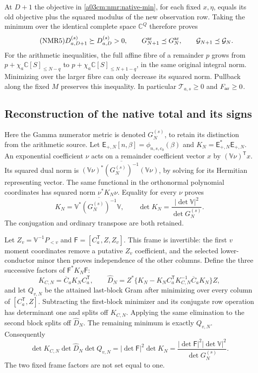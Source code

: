\documentclass[11pt,a4paper]{article}
\begin{document}
At $D+1$ the objective in \eqref{a03cm:nmr:native-min}, for each fixed
$x,\eta$, equals its old objective plus the squared modulus of the
new observation row. Taking the minimum over the identical complete
space $\mathbb C^Q$ therefore proves
\begin{equation}\tag{NMR5}\label{a03cm:nmr:monotonicity}
D_{a,D+1}^{(s)}\succeq D_{a,D}^{(s)}>0,\qquad
G_{N+1}^{\rm ar}\preceq G_N^{\rm ar},\qquad
\mathcal G_{N+1}\preceq\mathcal G_N .
\end{equation}
For the arithmetic inequalities, the full affine fibre of a remainder
$p$ grows from $p+\chi_a\mathbb C[S]_{\leq N-q}$ to
$p+\chi_a\mathbb C[S]_{\leq N+1-q}$, in the same original integral
norm. Minimizing over the larger fibre can only decrease its squared
norm. Pullback along the fixed $M$ preserves this inequality.
In particular $\mathcal T_{a,s}\geq0$ and $F_{\rm ar}\geq0$.

\subsection{Reconstruction of the native total and its signs}
Here the Gamma numerator metric is denoted $G_N^{(s)}$, to retain
its distinction from the arithmetic source. Let
$\mathsf E_{+,N}[n,\beta]=\phi_{n,s,c_0}(\beta)$ and
$K_N=\mathsf E_{+,N}^*\mathsf E_{+,N}$.
An exponential coefficient $\nu$ acts on a remainder coefficient
vector $x$ by $(\mathbb V\nu)^{\mathsf T}x$.
Its squared dual norm is
$(\mathbb V\nu)^*\overline{(G_N^{(s)})^{-1}}(\mathbb V\nu)$,
by solving for its Hermitian representing vector.
The same functional in the orthonormal polynomial coordinates has
squared norm $\nu^*K_N\nu$. Equality for every $\nu$ proves
\begin{equation}\tag{NMR6}\label{a03cm:nmr:dual}
K_N=\mathbb V^*\overline{(G_N^{(s)})^{-1}}\mathbb V,\qquad
\det K_N=\frac{|\det\mathbb V|^2}{\det G_N^{(s)}} .
\end{equation}
The conjugation and ordinary transpose are both retained.

Let $Z_v=\mathbb V^{-1}P_{<v}$ and
$\mathsf F=[C_a^{\mathsf T},Z,Z_v]$. This frame is invertible:
the first $v$ moment coordinates remove a putative $Z_v$ coefficient,
and the selected lower-conductor minor then proves independence of
the other columns. Define the three successive factors of
$\mathsf F^*K_N\mathsf F$:
\[
K_{C,N}=\overline C_aK_NC_a^{\mathsf T},\qquad
\widehat D_N=Z^*\{K_N-K_NC_a^{\mathsf T}K_{C,N}^{-1}
                                      \overline C_aK_N\}Z,
\]
and let $Q_{v,N}$ be the attained last-block Gram after minimizing
over every column of $[C_a^{\mathsf T},Z]$.
Subtracting the first-block minimizer and its conjugate row
operation has determinant one and splits off $K_{C,N}$.
Applying the same elimination to the second block splits off
$\widehat D_N$. The remaining minimum is exactly $Q_{v,N}$.
Consequently
\begin{equation}\tag{NMR7}\label{a03cm:nmr:factorization}
\det K_{C,N}\det\widehat D_N\det Q_{v,N}
=|\det\mathsf F|^2\det K_N
=\frac{|\det\mathsf F|^2|\det\mathbb V|^2}{\det G_N^{(s)}} .
\end{equation}
The two fixed frame factors are not set equal to one.
\end{document}
